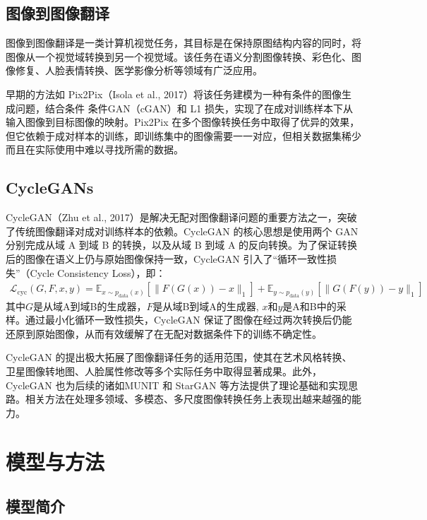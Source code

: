 \documentclass[UTF8,a4paper,12pt]{ctexart}
\numberwithin{equation}{section}
\begin{document}
\subsection{图像到图像翻译} 
图像到图像翻译是一类计算机视觉任务，其目标是在保持原图结构内容的同时，将图像从一个视觉域转换到另一个视觉域。该任务在语义分割图像转换、彩色化、图像修复、人脸表情转换、医学影像分析等领域有广泛应用。

早期的方法如 Pix2Pix（Isola et al., 2017）将该任务建模为一种有条件的图像生成问题，结合条件 条件GAN（cGAN）和 L1 损失，实现了在成对训练样本下从输入图像到目标图像的映射。Pix2Pix 在多个图像转换任务中取得了优异的效果，但它依赖于成对样本的训练，即训练集中的图像需要一一对应，但相关数据集稀少而且在实际使用中难以寻找所需的数据。

\subsection{CycleGANs}
CycleGAN（Zhu et al., 2017）是解决无配对图像翻译问题的重要方法之一，突破了传统图像翻译对成对训练样本的依赖。CycleGAN 的核心思想是使用两个 GAN 分别完成从域 A 到域 B 的转换，以及从域 B 到域 A 的反向转换。为了保证转换后的图像在语义上仍与原始图像保持一致，CycleGAN 引入了“循环一致性损失”（Cycle Consistency Loss），即：
\begin{eqnarray}
\mathcal{L}_{\text{cyc}}(G, F, x, y) = \mathbb{E}_{x \sim p_{\text{data}}(x)} \left[ \| F(G(x)) - x \|_1 \right] + \mathbb{E}_{y \sim p_{\text{data}}(y)} \left[ \| G(F(y)) - y \|_1 \right]
\end{eqnarray}
其中$G$是从域A到域B的生成器，$F$是从域B到域A的生成器, $x$和$y$是A和B中的采样。通过最小化循环一致性损失，CycleGAN 保证了图像在经过两次转换后仍能还原到原始图像，从而有效缓解了在无配对数据条件下的训练不确定性。

CycleGAN 的提出极大拓展了图像翻译任务的适用范围，使其在艺术风格转换、卫星图像转地图、人脸属性修改等多个实际任务中取得显著成果。此外，CycleGAN 也为后续的诸如MUNIT 和 StarGAN 等方法提供了理论基础和实现思路。相关方法在处理多领域、多模态、多尺度图像转换任务上表现出越来越强的能力。

\newpage
{}

\section{模型与方法}
\subsection{模型简介}
\end{document}
